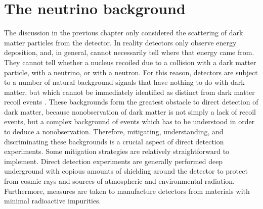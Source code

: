 \documentclass[b5paper, 10pt, twoside]{book}
\renewcommand{\vec}[1]{\symbfit{#1}}
\begin{document}



\chapter{The neutrino background}
\label{chap:background}

The discussion in the previous chapter only considered the scattering of dark matter particles from the detector. In reality detectors only observe energy deposition, and, in general, cannot necessarily tell where that energy came from. They cannot tell whether a nucleus recoiled due to a collision with a dark matter particle, with a neutrino, or with a neutron. For this reason, detectors are subject to a number of natural background signals that have nothing to do with dark matter, but which cannot be immediately identified as distinct from dark matter recoil events \parencite{BaxterEtAl2022}. These backgrounds form the greatest obstacle to direct detection of dark matter, because nonobservation of dark matter is not simply a lack of recoil events, but a complex background of events which has to be understood in order to deduce a nonobservation. Therefore, mitigating, understanding, and discriminating these backgrounds is a crucial aspect of direct detection experiments. Some mitigation strategies are relatively straightforward to implement. Direct detection experiments are generally performed deep underground with copious amounts of shielding around the detector to protect from cosmic rays and sources of atmospheric and environmental radiation. Furthermore, measures are taken to manufacture detectors from materials with minimal radioactive impurities.
\end{document}
